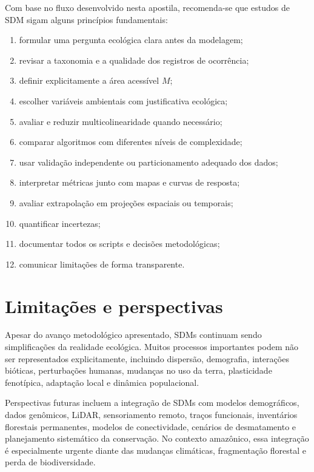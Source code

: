\documentclass{ueap-sdm}
\begin{document}
Com base no fluxo desenvolvido nesta apostila, recomenda-se que estudos de SDM sigam alguns princípios fundamentais:

\begin{enumerate}
	\item formular uma pergunta ecológica clara antes da modelagem;
	\item revisar a taxonomia e a qualidade dos registros de ocorrência;
	\item definir explicitamente a área acessível \(M\);
	\item escolher variáveis ambientais com justificativa ecológica;
	\item avaliar e reduzir multicolinearidade quando necessário;
	\item comparar algoritmos com diferentes níveis de complexidade;
	\item usar validação independente ou particionamento adequado dos dados;
	\item interpretar métricas junto com mapas e curvas de resposta;
	\item avaliar extrapolação em projeções espaciais ou temporais;
	\item quantificar incertezas;
	\item documentar todos os scripts e decisões metodológicas;
	\item comunicar limitações de forma transparente.
\end{enumerate}

\section{Limitações e perspectivas}

Apesar do avanço metodológico apresentado, SDMs continuam sendo simplificações da realidade ecológica. Muitos processos importantes podem não ser representados explicitamente, incluindo dispersão, demografia, interações bióticas, perturbações humanas, mudanças no uso da terra, plasticidade fenotípica, adaptação local e dinâmica populacional.

Perspectivas futuras incluem a integração de SDMs com modelos demográficos, dados genômicos, LiDAR, sensoriamento remoto, traços funcionais, inventários florestais permanentes, modelos de conectividade, cenários de desmatamento e planejamento sistemático da conservação. No contexto amazônico, essa integração é especialmente urgente diante das mudanças climáticas, fragmentação florestal e perda de biodiversidade.
\end{document}
